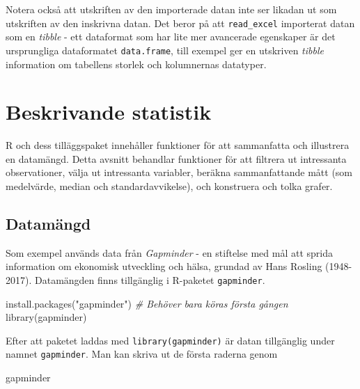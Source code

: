 \documentclass[
]{book}
\newenvironment{Shaded}{\begin{snugshade}}{\end{snugshade}}
\newcommand{\CommentTok}[1]{\textcolor[rgb]{0.56,0.35,0.01}{\textit{#1}}}
\newcommand{\FunctionTok}[1]{\textcolor[rgb]{0.00,0.00,0.00}{#1}}
\newcommand{\NormalTok}[1]{#1}
\newcommand{\StringTok}[1]{\textcolor[rgb]{0.31,0.60,0.02}{#1}}
\theoremstyle{definition}
\theoremstyle{definition}
\theoremstyle{definition}
\theoremstyle{definition}
\theoremstyle{remark}
\begin{document}
Notera också att utskriften av den importerade datan inte ser likadan ut som utskriften av den inskrivna datan. Det beror på att \texttt{read\_excel} importerat datan som en \emph{tibble} - ett dataformat som har lite mer avancerade egenskaper är det ursprungliga dataformatet \texttt{data.frame}, till exempel ger en utskriven \emph{tibble} information om tabellens storlek och kolumnernas datatyper.

\hypertarget{beskrivande-statistik}{%
\chapter{Beskrivande statistik}\label{beskrivande-statistik}}

R och dess tilläggspaket innehåller funktioner för att sammanfatta och illustrera en datamängd. Detta avsnitt behandlar funktioner för att filtrera ut intressanta observationer, välja ut intressanta variabler, beräkna sammanfattande mått (som medelvärde, median och standardavvikelse), och konstruera och tolka grafer.

\hypertarget{datamuxe4ngd}{%
\section{Datamängd}\label{datamuxe4ngd}}

Som exempel används data från \emph{Gapminder} - en stiftelse med mål att sprida information om ekonomisk utveckling och hälsa, grundad av Hans Rosling (1948-2017). Datamängden finns tillgänglig i R-paketet \texttt{gapminder}.

\begin{Shaded}
\begin{Highlighting}[]
\FunctionTok{install.packages}\NormalTok{(}\StringTok{"gapminder"}\NormalTok{) }\CommentTok{\# Behöver bara köras första gången}
\FunctionTok{library}\NormalTok{(gapminder)}
\end{Highlighting}
\end{Shaded}

Efter att paketet laddas med \texttt{library(gapminder)} är datan tillgänglig under namnet \texttt{gapminder}. Man kan skriva ut de första raderna genom

\begin{Shaded}
\begin{Highlighting}[]
\NormalTok{gapminder}
\end{Highlighting}
\end{Shaded}
\end{document}
